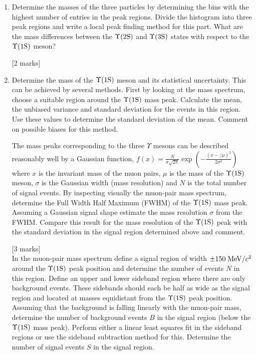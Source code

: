 \begin{enumerate}
\hfill [2 marks]


\item [6.2.] Determine the masses of the three particles by determining the bins with the highest number of entries in the peak regions. Divide the histogram into three peak regions and write a local peak finding method for this part.
What are the mass differences between the $\Upsilon \rm (2S)$ and $\Upsilon \rm (3S)$ states with respect to the $\Upsilon \rm (1S)$ meson? %

\hfill [2 marks]


\item [6.3.] Determine the mass of the  $\Upsilon \rm (1S)$  meson and its statistical uncertainty. This can be achieved by several methods. First  by looking at the mass spectrum, choose a suitable region around the $\Upsilon \rm (1S)$  mass peak. Calculate the mean, the unbiased variance and standard deviation for the events in this region. Use these values to determine the standard deviation of the mean. Comment on possible biases for this method. 


The mass peaks corresponding to the three $\Upsilon$ mesons can be described 
reasonably well by a Gaussian function, 
$f(x) = \frac{N}{\sigma \sqrt{2\pi}}  \exp{\left( - \frac{(x-/\mu)^2}{2\sigma^2} \right)} $
where $x$ is the invariant mass of the muon pairs, $\mu$ is the mass of the $\Upsilon \rm (1S)$  meson, $\sigma$ is the Gaussian width (mass resolution) and $N$ is the total number of signal events. 
By inspecting visually the muon-pair mass
spectrum, determine the Full Width Half Maximum (FWHM) of the $\Upsilon \rm (1S)$ mass peak.
Assuming a Gaussian signal shape estimate the mass resolution $\sigma$ from the FWHM. %
Compare this result for the mass resolution of the $\Upsilon \rm (1S)$  peak with the standard deviation in the signal region determined above and comment.

\hfill [3 marks]\\


In the muon-pair mass spectrum define a signal region of width $\pm 150\; {\rm MeV}/c^2$ around the $\Upsilon \rm (1S)$  peak position and determine the number of events $N$ in this region. 
Define an upper and lower sideband region where there are only background events. These sidebands should each be half as wide as the signal region and located at masses equidistant from the $\Upsilon \rm (1S)$  peak position. Assuming that the background is falling linearly with the muon-pair mass, determine the number of background events $B$ in the signal region (below the $\Upsilon \rm (1S)$  mass peak). Perform either a linear least squares fit in the sideband regions or use the sideband subtraction method for this. Determine the number of signal events $S$ in the signal region.


\end{enumerate}
